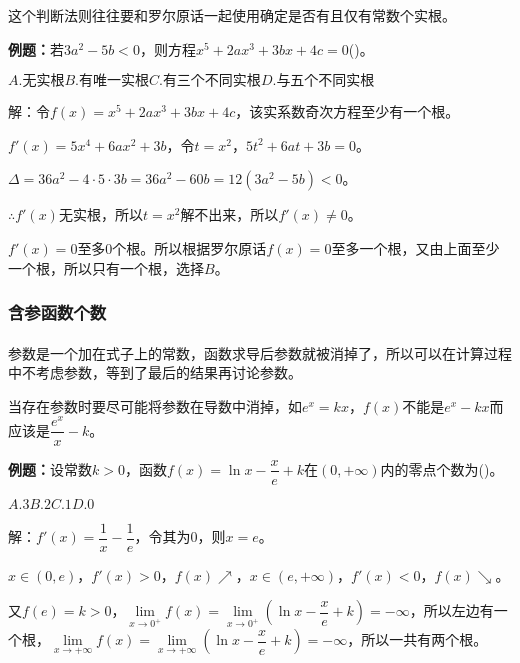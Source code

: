 这个判断法则往往要和罗尔原话一起使用确定是否有且仅有常数个实根。

\textbf{例题：}若$3a^2-5b<0$，则方程$x^5+2ax^3+3bx+4c=0$()。

$A.\text{无实根}$\qquad$B.\text{有唯一实根}$\qquad$C.\text{有三个不同实根}$\qquad$D.\text{与五个不同实根}$

解：令$f(x)=x^5+2ax^3+3bx+4c$，该实系数奇次方程至少有一个根。

$f'(x)=5x^4+6ax^2+3b$，令$t=x^2$，$5t^2+6at+3b=0$。

$\Delta=36a^2-4\cdot5\cdot3b=36a^2-60b=12(3a^2-5b)<0$。

$\therefore f'(x)$无实根，所以$t=x^2$解不出来，所以$f'(x)\neq0$。

$f'(x)=0$至多0个根。所以根据罗尔原话$f(x)=0$至多一个根，又由上面至少一个根，所以只有一个根，选择$B$。

\subsubsection{含参函数个数}

\paragraph{} \leavevmode \medskip

参数是一个加在式子上的常数，函数求导后参数就被消掉了，所以可以在计算过程中不考虑参数，等到了最后的结果再讨论参数。

当存在参数时要尽可能将参数在导数中消掉，如$e^x=kx$，$f(x)$不能是$e^x-kx$而应该是$\dfrac{e^x}{x}-k$。

\textbf{例题：}设常数$k>0$，函数$f(x)=\ln x-\dfrac{x}{e}+k$在$(0,+\infty)$内的零点个数为()。

$A.3$\qquad$B.2$\qquad$C.1$\qquad$D.0$

解：$f'(x)=\dfrac{1}{x}-\dfrac{1}{e}$，令其为0，则$x=e$。

$x\in(0,e)$，$f'(x)>0$，$f(x)\nearrow$，$x\in(e,+\infty)$，$f'(x)<0$，$f(x)\searrow$。

又$f(e)=k>0$，$\lim\limits_{x\to0^+}f(x)=\lim\limits_{x\to0^+}(\ln x-\dfrac{x}{e}+k)=-\infty$，所以左边有一个根，$\lim\limits_{x\to+\infty}f(x)=\lim\limits_{x\to+\infty}(\ln x-\dfrac{x}{e}+k)=-\infty$，所以一共有两个根。

\paragraph{} \leavevmode \medskip

